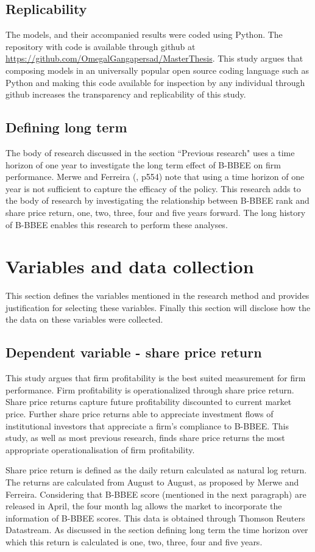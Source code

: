 \subsection{Replicability}
The models, and their accompanied results were coded using Python. The repository with code is available through github at \url{https://github.com/OmegalGangapersad/MasterThesis}. This study argues that composing models in an universally popular open source coding language such as Python and making this code available for inspection by any individual through github increases the transparency and replicability of this study. 
\subsection{Defining long term}
The body of research discussed in the section “Previous research" uses a time horizon of one year to investigate the long term effect of B-BBEE on firm performance. Merwe and Ferreira (\citeyear{N7}, p554) note that using a time horizon of one year is not sufficient to capture the efficacy of the policy. This research adds to the body of research by investigating the relationship between B-BBEE rank and share price return, one, two, three, four and five years forward. The long history of B-BBEE enables this research to perform these analyses. 
\section{Variables and data collection}
This section defines the variables mentioned in the research method and provides justification for selecting these variables. Finally this section will disclose how the the data on these variables were collected. 
\subsection{Dependent variable - share price return}
This study argues that firm profitability is the best suited measurement for firm performance. Firm profitability is operationalized through share price return. Share price returns capture future profitability discounted to current market price. Further share price returns able to appreciate investment flows of institutional investors that appreciate a firm’s compliance to B-BBEE. This study, as well as most previous research, finds share price returns the most appropriate operationalisation of firm profitability.

Share price return is defined as the daily return calculated as natural log return. The returns are calculated from August to August, as proposed by Merwe and Ferreira. Considering that B-BBEE score (mentioned in the next paragraph) are released in April, the four month lag allows the market to incorporate the information of B-BBEE scores. This data is obtained through Thomson Reuters Datastream. As discussed in the section defining long term the time horizon over which this return is calculated is one, two, three, four and five years.
